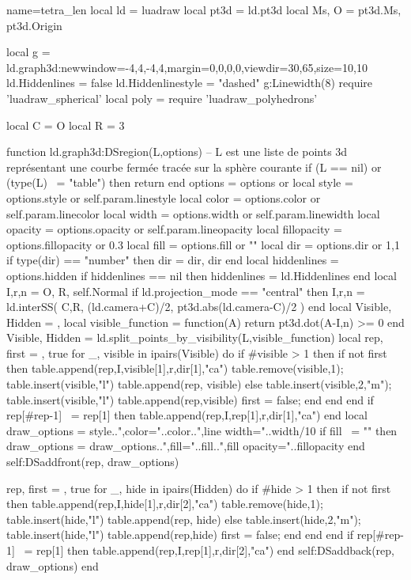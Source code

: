 \documentclass[border=2pt]{standalone}
\begin{document}
\begin{luadraw}{name=tetra_len}
local ld = luadraw
local pt3d = ld.pt3d
local Ms, O = pt3d.Ms, pt3d.Origin

local g = ld.graph3d:new{window={-4,4,-4,4},margin={0,0,0,0},viewdir={30,65},size={10,10}}
ld.Hiddenlines = false
ld.Hiddenlinestyle = "dashed"
g:Linewidth(8)
require 'luadraw_spherical'
local poly = require 'luadraw_polyhedrons'

local C = O
local R = 3

function ld.graph3d:DSregion(L,options)
-- L est une liste de points 3d représentant une courbe fermée tracée sur la sphère courante
    if (L == nil) or (type(L) ~= "table") then return end
    options = options or {}
    local style = options.style or self.param.linestyle
    local color = options.color or self.param.linecolor
    local width = options.width or self.param.linewidth
    local opacity = options.opacity or self.param.lineopacity
    local fillopacity = options.fillopacity or 0.3
    local fill = options.fill or ""
    local dir = options.dir or {1,1}
    if type(dir) == "number" then dir = {dir, dir} end
    local hiddenlines = options.hidden
    if hiddenlines == nil then hiddenlines = ld.Hiddenlines end
    local I,r,n = O, R, self.Normal
    if ld.projection_mode == "central" then
        I,r,n = ld.interSS( {C,R}, { (ld.camera+C)/2, pt3d.abs(ld.camera-C)/2} )
    end
    local Visible, Hidden = {},{}
    local visible_function = function(A)
        return pt3d.dot(A-I,n) >= 0
    end
    Visible, Hidden =  ld.split_points_by_visibility(L,visible_function)
    local rep, first = {}, true
    for _, visible in ipairs(Visible) do
        if #visible > 1 then
            if not first then 
                table.append(rep,{I,visible[1],r,dir[1],"ca"})
                table.remove(visible,1); table.insert(visible,"l")
                table.append(rep, visible)
            else
                table.insert(visible,2,"m"); 
                table.insert(visible,"l")
                table.append(rep,visible)
                first = false; 
            end
        end
    end
    if rep[#rep-1] ~= rep[1] then
        table.append(rep,{I,rep[1],r,dir[1],"ca"})
    end
    local draw_options = style..",color="..color..",line width="..width/10
    if fill ~= "" then
        draw_options = draw_options..",fill="..fill..",fill opacity="..fillopacity
    end
    self:DSaddfront(rep, draw_options)

    rep, first = {}, true
    for _, hide in ipairs(Hidden) do
       if #hide > 1 then
            if not first then 
                table.append(rep,{I,hide[1],r,dir[2],"ca"})
                table.remove(hide,1); table.insert(hide,"l")
                table.append(rep, hide)
            else
                table.insert(hide,2,"m"); 
                table.insert(hide,"l")
                table.append(rep,hide)
                first = false; 
            end
        end
    end
    if rep[#rep-1] ~= rep[1] then
        table.append(rep,{I,rep[1],r,dir[2],"ca"})
    end
    self:DSaddback(rep, draw_options)
end


\end{luadraw}
\end{document}
